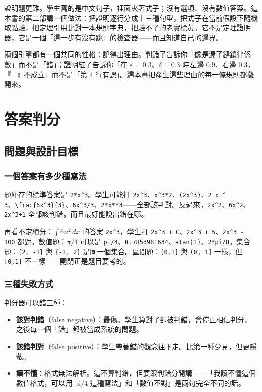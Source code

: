 \documentclass[11pt,a4paper,oneside]{book}
\renewcommand{\_}{\ifmmode\origunderscore\else\textunderscore\allowbreak\fi}
\newcommand{\code}[1]{\texttt{#1}}
\begin{document}
證明題更難。學生寫的是中文句子，裡面夾著式子；沒有選項、沒有數值答案。這本書的第二部講一個做法：把證明逐行分成十三種句型，把式子在當前假設下隨機取點驗，把定理引用比對一本規則字典，把驗不了的老實標黃。它不是定理證明器，它是一個「這一步有沒有跳」的檢查器——而且知道自己的邊界。

兩個引擎都有一個共同的性格：說得出理由。判錯了告訴你「像是漏了鏈鎖律係數」而不是「錯」；證明紅了告訴你「在 $\varepsilon = 0.3$、$\delta = 0.3$ 時左邊 0.9、右邊 0.3，『=』不成立」而不是「第 4 行有誤」。這本書把產生這些理由的每一條規則都攤開來。

\tableofcontents

\part{答案判分}

\chapter{問題與設計目標}
\section{一個答案有多少種寫法}
題庫存的標準答案是 \code{2*x\string^3}。學生可能打 \code{2x\string^3}、\code{x\string^3*2}、\code{(2x\string^3)}、\code{2 x \string^ 3}、\code{\textbackslash frac\{6x\string^3\}\{3\}}、\code{6x\string^3/3}、\code{2*x**3}——全部該判對。反過來，\code{2x\string^2}、\code{6x\string^2}、\code{2x\string^3+1} 全部該判錯，而且最好能說出錯在哪。

再看不定積分：$\int 6x^2\,dx$ 的答案 \code{2x\string^3}，學生打 \code{2x\string^3 + C}、\code{2x\string^3 + 5}、\code{2x\string^3 - 100} 都對。數值題：$\pi/4$ 可以是 \code{pi/4}、\code{0.7853981634}、\code{atan(1)}、\code{2*pi/8}。集合題：\code{\{2, -1\}} 與 \code{\{-1, 2\}} 是同一個集合。區間題：\code{(0,1]} 與 \code{(0, 1]} 一樣，但 \code{[0,1]} 不一樣——開閉正是題目要考的。

\section{三種失敗方式}
判分器可以錯三種：
\begin{itemize}
  \item \textbf{該對判錯}（false negative）：最傷。學生算對了卻被判錯，會停止相信判分，之後每一個「錯」都被當成系統的問題。
  \item \textbf{該錯判對}（false positive）：學生帶著錯的觀念往下走。比第一種少見，但更隱蔽。
  \item \textbf{讀不懂}：格式無法解析。這不算判錯，但要跟判錯分開講——「我讀不懂這個數值格式，可以用 pi/4 這種寫法」和「數值不對」是兩句完全不同的話。
\end{itemize}
\end{document}
